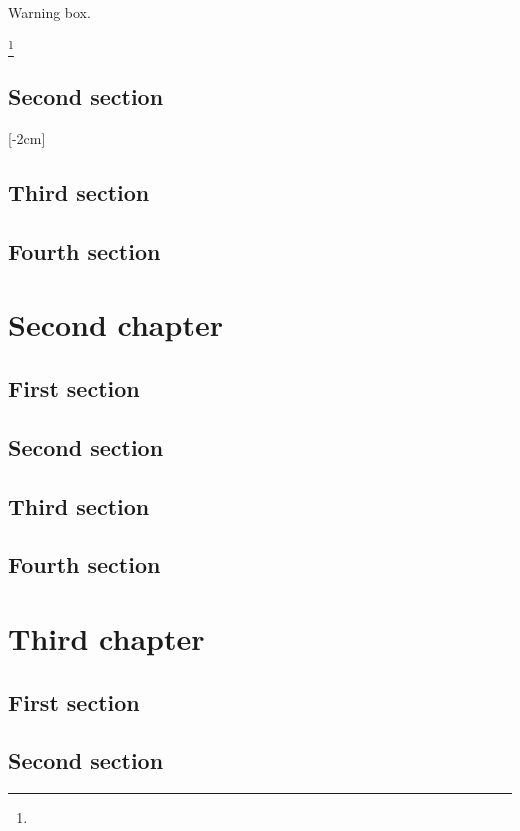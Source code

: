 \documentclass{researchbook}
\begin{document}
\begin{marker}
  Warning box.
\end{marker}

\footnote{\lipsum}

\section{Second section}\lipsum
\reversemarginpar{}[-2cm]
\section{Third section}\lipsum
\section{Fourth section}\lipsum

\chapter{Second chapter}

\section{First section}\lipsum
\section{Second section}\lipsum
\section{Third section}\lipsum
\section{Fourth section}\lipsum


\chapter{Third chapter}

\section{First section}\lipsum
\section{Second section}\lipsum
\end{document}
